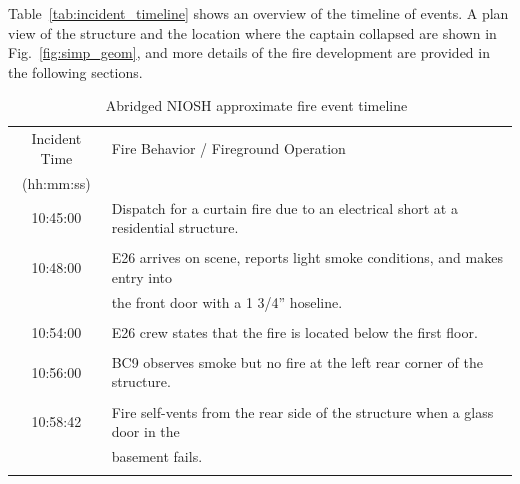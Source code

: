\documentclass[12pt,oneside]{book}
\begin{document}
\noindent Table~\ref{tab:incident_timeline} shows an overview of the timeline of events. A plan view of the structure and the location where the captain collapsed are shown in Fig.~\ref{fig:simp_geom}, and more details of the fire development are provided in the following sections.

\begin{table}[!ht]
\caption[Abridged NIOSH approximate fire event timeline]{Abridged NIOSH approximate fire event timeline~\cite{NIOSH:Bowyer2}}
\begin{tabular}{cl}
\toprule
Incident Time  &  Fire Behavior / Fireground Operation                                                \\
{(hh:mm:ss)}   &                                                                                      \\
\midrule
10:45:00       &  Dispatch for a curtain fire due to an electrical short at a residential structure.  \\
               &                                                                                      \\
10:48:00       &  E26 arrives on scene, reports light smoke conditions, and makes entry into          \\
               &  the front door with a 1 3/4'' hoseline.                                             \\
               &                                                                                      \\
10:54:00       &  E26 crew states that the fire is located below the first floor.                     \\
               &                                                                                      \\
10:56:00       &  BC9 observes smoke but no fire at the left rear corner of the structure.            \\
               &                                                                                      \\
10:58:42       &  Fire self-vents from the rear side of the structure when a glass door in the        \\
               &  basement fails.                                                                     \\
               &                                                                                      \\

\end{tabular}
\end{table}
\end{document}
